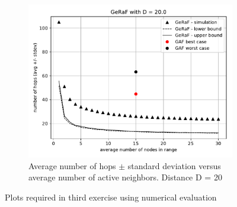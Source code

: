 \documentclass[11pt,a4paper]{article}
\begin{document}
\begin{figure}[ht]
\begin{subfigure}{.45\textwidth}
\end{subfigure}
\begin{subfigure}{.5\textwidth}
  \centering
  \includegraphics[width=\linewidth]{hops_bounds_D=20.pdf}
  \caption{Average number of hops $\pm$ standard deviation versus average number of active neighbors. Distance D = 20}
  \label{fig:hops20Bounds}
\end{subfigure}
\caption{Plots required in third exercise using numerical evaluation}
\end{figure}
\end{document}
